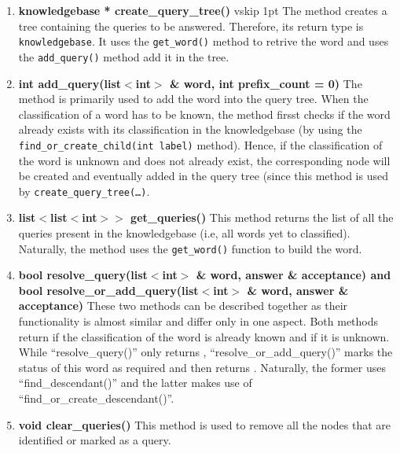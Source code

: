 \begin{enumerate}
\item \textbf{knowledgebase * create\_query\_tree()} \hfill vskip 1pt
	The method creates a tree containing the queries to be answered. Therefore, its return type is \texttt{knowledgebase}.
It uses the \texttt{get\_word()} method to retrive the word and uses the \texttt{add\_query()} method add it in the tree.

\item \textbf{int add\_query(list$<$int$>$ \& word, int prefix\_count = 0)} \hfill \vskip 1pt
	The method is primarily used to add the word into the query tree. When the classification of a word has to be known, the method firsst checks if the word already exists with its classification in the knowledgebase (by using the \texttt{find\_or\_create\_child(int label)} method). Hence, if the classification of the word is unknown and does not already exist, the corresponding node will be created and eventually added in the query tree (since this method is used by \texttt{create\_query\_tree(\ldots)}.
  
\item \textbf{list$<$list$<$int$>$$>$ get\_queries()} \hfill \vskip 1pt
	This method returns the list of all the queries present in the knowledgebase (i.e, all words yet to classified). Naturally, the method uses the \texttt{get\_word()} function to build the word.
	
\item \textbf{bool resolve\_query(list$<$int$>$ \& word, answer \& acceptance) and bool resolve\_or\_add\_query(list$<$int$>$ \& word, answer \& acceptance)} \hfill \vskip 1pt
	These two methods can be described together as their functionality is almost similar and differ only in one aspect. Both methods return \true if the classification of the word is already known and \false if it is unknown. While ``resolve\_query()'' only returns \false, ``resolve\_or\_add\_query()'' marks the status of this word as required and then returns \false. Naturally, the former uses ``find\_descendant()'' and the latter makes use of ``find\_or\_create\_descendant()''.

\item \textbf{void clear\_queries()} \hfill \vskip 1pt
	This method is used to remove all the nodes that are identified or marked as a query.
\end{enumerate}
\vskip 1pt
\vskip 1pt
